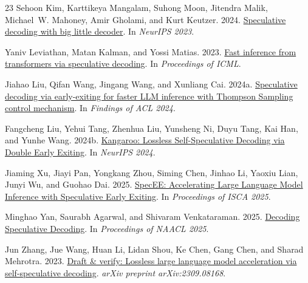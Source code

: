 \documentclass[11pt]{article}
\begin{document}
\begin{thebibliography}{23}
Sehoon Kim, Karttikeya Mangalam, Suhong Moon, Jitendra Malik, Michael~W. Mahoney, Amir Gholami, and Kurt Keutzer. 2024.
\newblock \href{https://arxiv.org/abs/2302.07863}{Speculative decoding with big little decoder}.
\newblock In \emph{NeurIPS 2023}.

Yaniv Leviathan, Matan Kalman, and Yossi Matias. 2023.
\newblock \href{https://arxiv.org/abs/2211.17192}{Fast inference from transformers via speculative decoding}.
\newblock In \emph{Proceedings of ICML}.

Jiahao Liu, Qifan Wang, Jingang Wang, and Xunliang Cai. 2024a.
\newblock \href{https://arxiv.org/abs/2406.03853}{Speculative decoding via early-exiting for faster LLM inference with Thompson Sampling control mechanism}.
\newblock In \emph{Findings of ACL 2024}.

Fangcheng Liu, Yehui Tang, Zhenhua Liu, Yunsheng Ni, Duyu Tang, Kai Han, and Yunhe Wang. 2024b.
\newblock \href{https://arxiv.org/abs/2404.18911}{Kangaroo: Lossless Self-Speculative Decoding via Double Early Exiting}.
\newblock In \emph{NeurIPS 2024}.

Jiaming Xu, Jiayi Pan, Yongkang Zhou, Siming Chen, Jinhao Li, Yaoxiu Lian, Junyi Wu, and Guohao Dai. 2025.
\newblock \href{https://arxiv.org/abs/2504.08850}{SpecEE: Accelerating Large Language Model Inference with Speculative Early Exiting}.
\newblock In \emph{Proceedings of ISCA 2025}.

Minghao Yan, Saurabh Agarwal, and Shivaram Venkataraman. 2025.
\newblock \href{https://arxiv.org/abs/2402.01528}{Decoding Speculative Decoding}.
\newblock In \emph{Proceedings of NAACL 2025}.

Jun Zhang, Jue Wang, Huan Li, Lidan Shou, Ke Chen, Gang Chen, and Sharad Mehrotra. 2023.
\newblock \href{https://arxiv.org/abs/2309.08168}{Draft \& verify: Lossless large language model acceleration via self-speculative decoding}.
\newblock \emph{arXiv preprint arXiv:2309.08168}.


\end{thebibliography}
\end{document}
